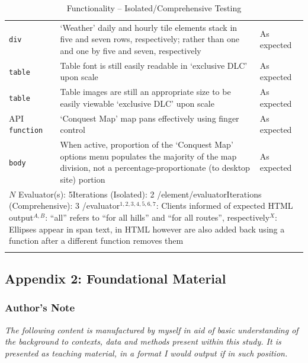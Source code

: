 \documentclass[11pt, english]{article}
\begin{document}
\begin{center}
\begin{longtable}{p{3cm}p{8cm}p{2cm}}
		\texttt{div} & `Weather' daily and hourly tile elements stack in five and seven rows, respectively; rather than one and one by five and seven, respectively & As expected\\
		\texttt{table} & Table font is still easily readable in `exclusive DLC' upon scale & As expected\\
		\texttt{table} & Table images are still an appropriate size to be easily viewable `exclusive DLC' upon scale & As expected\\
		API \texttt{function} & `Conquest Map' map pans effectively using finger control & As expected\\
		\texttt{body} & When active, proportion of the `Conquest Map' options menu populates the majority of the map division, not a percentage-proportionate (to desktop site) portion & As expected\\
		\hline
		\multicolumn{3}{p{12.5cm}}{$N$ Evaluator(s): 5\newline Iterations (Isolated): 2 /element/evaluator\newline Iterations (Comprehensive): 3 /evaluator\newline $^{1,2,3,4,5,6,7}$: Clients informed of expected HTML output\newline $^{A,B}$: ``all'' refers to ``for all hills'' and ``for all routes'', respectively\newline $^{X}$: Ellipses appear in span text, in HTML however are also added back using a function after a different function removes them}\\
		\hline
		\caption{Functionality -- Isolated/Comprehensive Testing}
	\end{longtable}
	\end{center}

\newpage

	\subsection*{Appendix 2: Foundational Material}

		\subsubsection*{Author's Note}

			\textit{The following content is manufactured by myself in aid of basic understanding of the background to contexts, data and methods present within this study. It is presented as teaching material, in a format I would output if in such position.}
\end{document}
